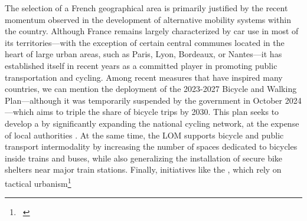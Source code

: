 \begin{refsegment}
The selection of a French geographical area is primarily justified by the recent momentum observed in the development of alternative mobility systems within the country. Although France remains largely characterized by car use in most of its territories—with the exception of certain central communes located in the heart of large urban areas, such as Paris, Lyon, Bordeaux, or Nantes—it has established itself in recent years as a committed player in promoting public transportation and cycling. Among recent measures that have inspired many countries, we can mention the deployment of the 2023-2027 Bicycle and Walking Plan—although it was temporarily suspended by the government in October 2024—which aims to triple the share of bicycle trips by 2030. This plan seeks to develop a  by significantly expanding the national cycling network, at the expense of local authorities \textcolor{blue}{\autocite{ministere_de_la_transition_ecologique_et_de_la_cohesion_des_territoires_velo_2023}}. At the same time, the \acrfull{LOM} supports bicycle and public transport intermodality by increasing the number of spaces dedicated to bicycles inside trains and buses, while also generalizing the installation of secure bike shelters near major train stations. Finally, initiatives like the , which rely on \gls{tactical urbanism}\footnote{~
}
\end{refsegment}
